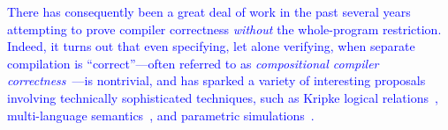 {%
\textcolor{blue}{
There has consequently been a great deal of work in the past several
years attempting to prove compiler correctness \emph{without} the
whole-program restriction.  Indeed, it turns out that even specifying,
let alone verifying, when separate compilation is ``correct''---often
referred to as \emph{compositional compiler
  correctness}~\cite{TODO}---is nontrivial, and has sparked
a variety of interesting proposals involving technically sophisticated
techniques, such as Kripke logical relations~\cite{TODO},
multi-language semantics~\cite{TODO}, and parametric
simulations~\cite{TODO}.
}














}
